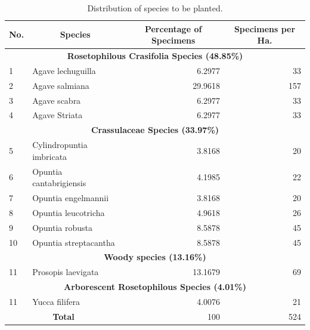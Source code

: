 \documentclass{amsart}
\begin{document}
        \begin{table}[h!]
            \scriptsize
            \begin{tabular}{llrr}
            \toprule
            \multicolumn{1}{c}{\textbf{No.}} &
              \multicolumn{1}{c}{\textbf{Species}} &
              \multicolumn{1}{c}{\textbf{Percentage of Specimens}} &
              \multicolumn{1}{c}{\textbf{Specimens per Ha.}} \\
              \midrule
            \multicolumn{4}{c}{\textbf{Rosetophilous Crasifolia Species (48.85\%)}}  \\
            \midrule
            1          & Agave lechuguilla               & 6.2977        & 33        \\
            2          & Agave salmiana                  & 29.9618       & 157       \\
            3          & Agave scabra                    & 6.2977        & 33        \\
            4          & Agave Striata                   & 6.2977        & 33        \\
            \midrule
            \multicolumn{4}{c}{\textbf{Crassulaceae Species (33.97\%)}}              \\
            \midrule
            5          & Cylindropuntia imbricata        & 3.8168        & 20        \\
            6          & Opuntia cantabrigiensis         & 4.1985        & 22        \\
            7          & Opuntia engelmannii             & 3.8168        & 20        \\
            8          & Opuntia leucotricha             & 4.9618        & 26        \\
            9          & Opuntia robusta                 & 8.5878        & 45        \\
            10         & Opuntia streptacantha           & 8.5878        & 45        \\
            \midrule
            \multicolumn{4}{c}{\textbf{Woody species (13.16\%)}}                  \\
            \midrule
            11         & Prosopis laevigata              & 13.1679       & 69        \\
            \midrule
            \multicolumn{4}{c}{\textbf{Arborescent Rosetophilous Species (4.01\%)}} \\
            \midrule
            11         & Yucca filifera                  & 4.0076        & 21        \\
            \midrule
            \multicolumn{2}{c}{\textbf{Total}}           & 100           & 524   \\
            \bottomrule
            \end{tabular}
            \vspace{10pt}
            \caption{Distribution of species to be planted.}\label{tab:especies}
        \end{table}
        
\end{document}
